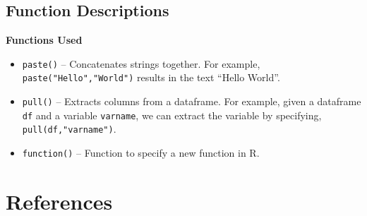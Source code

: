 \documentclass[
]{book}
\begin{document}
\section*{Function Descriptions}\label{function-descriptions-4}

\textbf{Functions Used}

\begin{itemize}
\item
  \texttt{paste()} -- Concatenates strings together. For example, \texttt{paste("Hello","World")} results in the text ``Hello World''.
\item
  \texttt{pull()} -- Extracts columns from a dataframe. For example, given a dataframe \texttt{df} and a variable \texttt{varname}, we can extract the variable by specifying, \texttt{pull(df,"varname")}.
\item
  \texttt{function()} -- Function to specify a new function in R.
\end{itemize}

\chapter*{References}\label{references-1}


\end{document}
